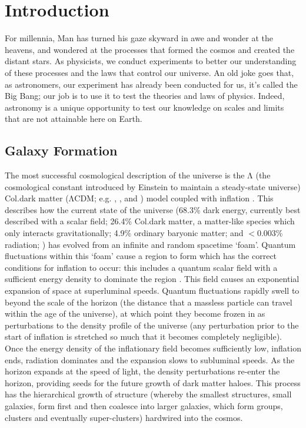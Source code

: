 \chapter{Introduction}
	\label{cha:intro}
For millennia, Man has turned his gaze skyward in awe and wonder at the heavens, and wondered at the processes that formed the cosmos and created the distant stars. As physicists, we conduct experiments to better our understanding of these processes and the laws that control our universe. An old joke goes that, as astronomers, our experiment has already been conducted for us, it's called the Big Bang; our job is to use it to test the theories and laws of physics. Indeed, astronomy is a unique opportunity to test our knowledge on scales and limits that are not attainable here on Earth.

\section{Galaxy Formation}
	The most successful cosmological description of the universe is the $\mathrm{\Lambda}$ (the cosmological constant introduced by Einstein to maintain a steady-state universe) Col.dark matter ({$\mathrm{\Lambda}$}CDM; e.g. \citealt{Peebles1982}, \citealt{Bond1982}, \citealt{Blumenthal1982} and \citealt{Blumenthal1984}) model coupled with inflation \citep[e.g.][]{Guth1981}. This describes how the current state of the universe (68.3\% dark energy, currently best described with a scalar field; 26.4\% Col.dark matter, a matter-like species which only interacts gravitationally; 4.9\% ordinary baryonic matter; and $<$0.003\% radiation; \citealt{PlanckCollaboration2016}) has evolved from an infinite and random spacetime `foam'. Quantum fluctuations within this `foam' cause a region to form which has the correct conditions for inflation to occur: this includes a quantum scalar field with a sufficient energy density to dominate the region \citep{Linde1982, Albrecht1982}. This field causes an exponential expansion of space at superluminal speeds. Quantum fluctuations rapidly swell to beyond the scale of the horizon (the distance that a massless particle can travel within the age of the universe), at which point they become frozen in as perturbations to the density profile of the universe (any perturbation prior to the start of inflation is stretched so much that it becomes completely negligible). Once the energy density of the inflationary field becomes sufficiently low, inflation ends, radiation dominates and the expansion slows to subluminal speeds. As the horizon expands at the speed of light, the density perturbations re-enter the horizon, providing seeds for the future growth of dark matter haloes. This process has the hierarchical growth of structure (whereby the smallest structures, small galaxies, form first and then coalesce into larger galaxies, which form groups, clusters and eventually super-clusters) hardwired into the cosmos. 

